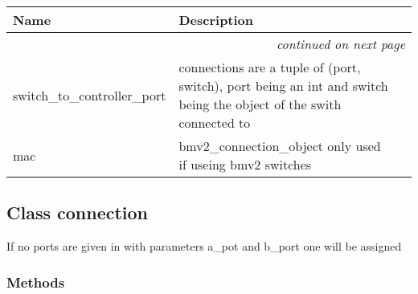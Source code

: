     \vspace{-1cm}
\hspace{\varindent}\begin{longtable}{|p{\varnamewidth}|p{\vardescrwidth}|l}
\cline{1-2}
\cline{1-2} \centering \textbf{Name} & \centering \textbf{Description}& \\
\cline{1-2}
\endhead\cline{1-2}\multicolumn{3}{r}{\small\textit{continued on next page}}\\\endfoot\cline{1-2}
\endlastfoot\raggedright s\-w\-i\-t\-c\-h\-\_\-t\-o\-\_\-c\-o\-n\-t\-r\-o\-l\-l\-e\-r\-\_\-p\-o\-r\-t\- & connections are a tuple of (port, switch), port being an int and 
          switch being the object of the swith connected to&\\
\cline{1-2}
\raggedright m\-a\-c\- & bmv2\_connection\_object only used if useing bmv2 switches&\\
\cline{1-2}
\end{longtable}



\subsection{Class connection}

    \label{Data_Plane_DHT:connection}
If no ports are given in with parameters a\_pot and b\_port one will be 
assigned



  \subsubsection{Methods}

    \label{Data_Plane_DHT:connection:__init__}

